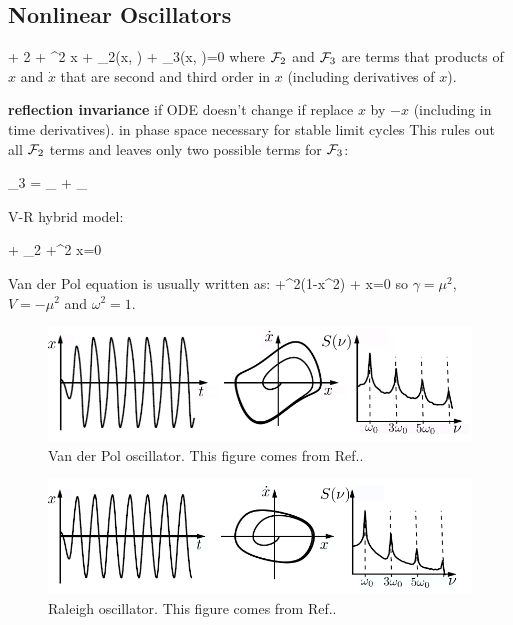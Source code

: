 \subsection{Nonlinear Oscillators}

\beq
{} + 2\gamma {} + \omega^2 x + \calf_2(x, )  + \calf_3(x, )=0
\eeq
where ${\cal F}_2$ and ${\cal F}_3$ are terms that 
products of $x$ and $\dot{x}$ that are second and third order in $x$ (including derivatives of $x$).


{\bf reflection invariance} if ODE doesn't change if replace $x$ by $-x$ (including
in time derivatives). in phase space necessary for stable limit cycles
This rules out all ${\cal F}_2$ terms
and leaves only two possible terms for ${\cal F}_3$:

\beq 
\calf_3 = _{}
+ _{}
\eeq

V-R hybrid model:

\beq
{} + _{2\TIL{\gamma}}
 +\omega^2 x=0
\eeq

Van der Pol equation is usually written as:
\beq {}  +\mu^2(1-x^2) + x=0\eeq
 so $\gamma = \mu^2$, $V=-\mu^2$
and $\omega^2=1$.


\begin{figure}[h!]
\centering
\includegraphics[width=5in]
{dynamical-sys/van-der-pol-term.png}
\caption{Van der Pol oscillator. This
 figure  comes from Ref.\cite{dynamical-fuchs}.}
\label{fig-van-der-pol-term}
\end{figure}

\begin{figure}[h!]
\centering
\includegraphics[width=5in]
{dynamical-sys/raleigh-term.png}
\caption{Raleigh oscillator. This
 figure  comes from Ref.\cite{dynamical-fuchs}.}
\label{fig-raleigh-term}
\end{figure}

